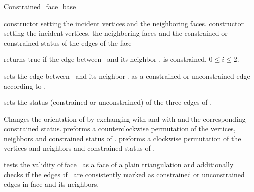 \begin{ccClass}{Constrained_face_base}

\ccThreeToTwo

\ccCreation
{}
\ccGlue
{}
\ccGlue
{} 
{constructor setting the incident vertices and the neighboring faces.}
\ccGlue
{}
 {constructor setting the incident vertices, the neighboring faces and 
the constrained or constrained status of the edges of the face}
                   
{returns true if the edge between \ccVar\ and its neighbor 
\ccVar . is constrained.
\ccPrecond $0\leq i \leq 2$.}


\ccModifiers
{}
{sets the edge between \ccVar\ and its neighbor \ccVar .
 as a constrained or unconstrained edge according to .}

{sets the status (constrained or unconstrained) of the three
edges of \ccVar.}

{Changes the orientation of \ccVar by exchanging 
with  and  with 
and the corresponding constrained status.}
{preforms a counterclockwise permutation of the
 vertices, neighbors and constrained status of  \ccVar.}
{preforms a clockwise permutation of the
 vertices and neighbors and constrained status of \ccVar.}


\begin{ccAdvanced}
{tests the validity of face  \ccVar\ 
as a face of a plain triangulation
and additionally checks
if the edges of \ccVar\ are consistently marked
as constrained or unconstrained edges
in face \ccVar and its neighbors.}
\end{ccAdvanced}
\end{ccClass}


